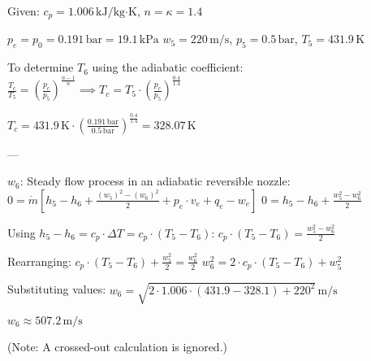 Given:  
\( c_p = 1.006 \, \text{kJ/kg·K} \), \( n = \kappa = 1.4 \)  

\( p_e = p_0 = 0.191 \, \text{bar} = 19.1 \, \text{kPa} \)  
\( w_5 = 220 \, \text{m/s} \), \( p_5 = 0.5 \, \text{bar} \), \( T_5 = 431.9 \, \text{K} \)  

To determine \( T_6 \) using the adiabatic coefficient:  
\( \frac{T_c}{T_5} = \left( \frac{p_c}{p_5} \right)^{\frac{n-1}{n}} \implies T_c = T_5 \cdot \left( \frac{p_c}{p_5} \right)^{\frac{0.4}{1.4}} \)  

\( T_c = 431.9 \, \text{K} \cdot \left( \frac{0.191 \, \text{bar}}{0.5 \, \text{bar}} \right)^{\frac{0.4}{1.4}} = 328.07 \, \text{K} \)  

---

\( w_6 \): Steady flow process in an adiabatic reversible nozzle:  
\( 0 = \dot{m} \left[ h_5 - h_6 + \frac{(w_5)^2 - (w_6)^2}{2} + p_e \cdot v_e + q_e - w_e \right] \)  
\( 0 = h_5 - h_6 + \frac{w_5^2 - w_6^2}{2} \)  

Using \( h_5 - h_6 = c_p \cdot \Delta T = c_p \cdot (T_5 - T_6) \):  
\( c_p \cdot (T_5 - T_6) = \frac{w_5^2 - w_6^2}{2} \)  

Rearranging:  
\( c_p \cdot (T_5 - T_6) + \frac{w_5^2}{2} = \frac{w_6^2}{2} \)  
\( w_6^2 = 2 \cdot c_p \cdot (T_5 - T_6) + w_5^2 \)  

Substituting values:  
\( w_6 = \sqrt{2 \cdot 1.006 \cdot (431.9 - 328.1) + 220^2} \, \text{m/s} \)  

\( w_6 \approx 507.2 \, \text{m/s} \)  

(Note: A crossed-out calculation is ignored.)